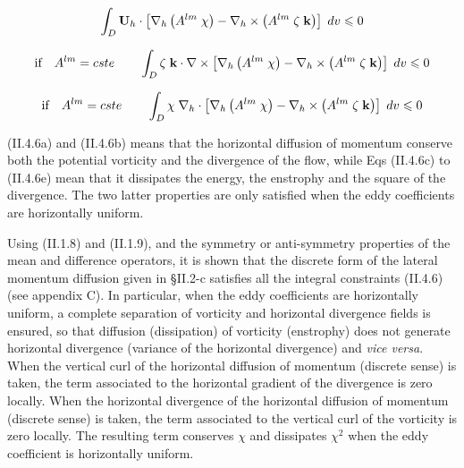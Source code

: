 \begin{equation} \label{Eq_dynldf_curl}
\int_D {{\rm {\bf U}}_h \cdot \left[ {\nabla _h \left( {A^{lm}\;\chi } 
\right)-\nabla _h \times \left( {A^{lm}\;\zeta \;{\rm {\bf k}}} \right)} 
\right]\;dv} \leqslant 0
\end{equation}

\begin{equation} \label{Eq_dynldf_curl2}
\mbox{if}\quad A^{lm}=cste\quad \quad \int_D {\zeta \;{\rm {\bf k}}\cdot 
\nabla \times \left[ {\nabla _h \left( {A^{lm}\;\chi } \right)-\nabla _h 
\times \left( {A^{lm}\;\zeta \;{\rm {\bf k}}} \right)} \right]\;dv} 
\leqslant 0
\end{equation}

\begin{equation} \label{Eq_dynldf_div2}
\mbox{if}\quad A^{lm}=cste\quad \quad \int_D {\chi \;\nabla _h \cdot \left[ 
{\nabla _h \left( {A^{lm}\;\chi } \right)-\nabla _h \times \left( 
{A^{lm}\;\zeta \;{\rm {\bf k}}} \right)} \right]\;dv} \leqslant 0
\end{equation}


(II.4.6a) and (II.4.6b) means that the horizontal diffusion of momentum 
conserve both the potential vorticity and the divergence of the flow, while 
Eqs (II.4.6c) to (II.4.6e) mean that it dissipates the energy, the enstrophy 
and the square of the divergence. The two latter properties are only 
satisfied when the eddy coefficients are horizontally uniform.

Using (II.1.8) and (II.1.9), and the symmetry or anti-symmetry properties of 
the mean and difference operators, it is shown that the discrete form of the 
lateral momentum diffusion given in {\S}II.2-c satisfies all the integral 
constraints (II.4.6) (see appendix C). In particular, when the eddy 
coefficients are horizontally uniform, a complete separation of vorticity 
and horizontal divergence fields is ensured, so that diffusion (dissipation) 
of vorticity (enstrophy) does not generate horizontal divergence (variance 
of the horizontal divergence) and \textit{vice versa}. When the vertical curl of the horizontal 
diffusion of momentum (discrete sense) is taken, the term associated to the 
horizontal gradient of the divergence is zero locally. When the horizontal 
divergence of the horizontal diffusion of momentum (discrete sense) is 
taken, the term associated to the vertical curl of the vorticity is zero 
locally. The resulting term conserves $\chi$ and dissipates 
$\chi^2$ when the 
eddy coefficient is horizontally uniform.

